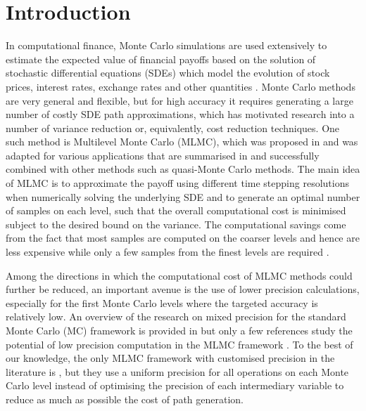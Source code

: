 \section{Introduction}\label{sec:intro}

In computational finance, Monte Carlo simulations are used extensively to estimate the expected value of financial payoffs based on the solution of stochastic differential equations (SDEs) which model the evolution of stock prices, interest rates, exchange rates and other quantities \cite{glasserman04}.  Monte Carlo methods are very general and flexible, but for high accuracy it requires generating a large number of costly SDE path approximations, which has motivated research into a number of variance reduction or, equivalently, cost reduction techniques. One such method is
Multilevel Monte Carlo (MLMC), which was proposed in \cite{GILES2008} and was adapted for various applications that are summarised in \cite{Giles_overview17} and successfully combined with other methods such as quasi-Monte Carlo methods. The main idea of MLMC is to approximate the payoff using different time stepping resolutions when numerically solving the underlying SDE and to generate an optimal number of samples on each level, such that the overall computational cost is minimised subject to the desired bound on the variance. %
The computational savings come from the fact that most samples are computed on the coarser levels and hence are less expensive while only a few samples from the finest levels are required \cite{GILES2008}.


Among the directions in which the computational cost 
of MLMC methods could further be reduced, an important avenue is the use of lower precision calculations, especially for the first Monte Carlo levels where the targeted accuracy is relatively low. 
 An overview of the research on mixed precision for the standard Monte Carlo (MC) framework is provided in \cite{ChowMixedPrecisionStandardMC} but only a few references study the potential of low precision computation in the MLMC framework \cite{Rounding_error_oliver}. To the best of our knowledge, the only MLMC framework with customised precision in the literature is \cite{brugger2014mixed}, but they use a uniform precision for all operations on each Monte Carlo level instead of optimising 
 the precision of each intermediary variable to reduce as much as possible the cost of path generation.
 
